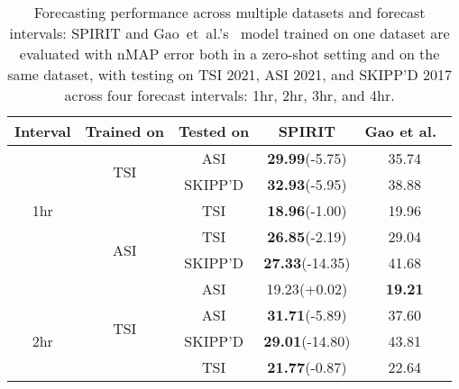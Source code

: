 \begin{table}[h!]
  \caption{
  Forecasting performance across multiple datasets and forecast intervals: SPIRIT and Gao~et~al.'s~\cite{wacv2022} model trained on one dataset are evaluated with nMAP error both in a zero-shot setting and on the same dataset, with testing on TSI 2021, ASI 2021, and SKIPP'D 2017 across four forecast intervals: 1hr, 2hr, 3hr, and 4hr.
  }
  \label{tab:zeroshot_forecast}
  \centering
  \setlength{\tabcolsep}{2pt}
  \renewcommand{\arraystretch}{1.2} 
  \begin{tabular}{c c c c c}
    \hline
    \textbf{Interval} & \textbf{Trained on} & \textbf{Tested on} & \textbf{SPIRIT} & \textbf{Gao et al.~\cite{wacv2022}} \\
    \hline
    \multirow{5}{*}{1hr} & \multirow{2}{*}{TSI} & ASI & \textbf{29.99}\hspace{1mm}\small{\textcolor{mydarkgreen}{(-5.75)}} & 35.74 \\
                          & & SKIPP'D & \textbf{32.93}\hspace{1mm}\small{\textcolor{mydarkgreen}{(-5.95)}} & 38.88 \\
                          & & TSI & \textbf{18.96}\hspace{1mm}\small{\textcolor{mydarkgreen}{(-1.00)}} & 19.96 \\
                          \cline{2-5}
                          & \multirow{2}{*}{ASI} & TSI & \textbf{26.85}\hspace{1mm}\small{\textcolor{mydarkgreen}{(-2.19)}} & 29.04 \\
                          & & SKIPP'D & \textbf{27.33}\hspace{1mm}\small{\textcolor{mydarkgreen}{(-14.35)}} & 41.68 \\
                          & & ASI & 19.23\hspace{1mm}\small{\textcolor{mydarkred}{(+0.02)}} & \textbf{19.21} \\
    \hline
    \multirow{5}{*}{2hr} & \multirow{2}{*}{TSI} & ASI & \textbf{31.71}\hspace{1mm}\small{\textcolor{mydarkgreen}{(-5.89)}} & 37.60 \\
                          & & SKIPP'D & \textbf{29.01}\hspace{1mm}\small{\textcolor{mydarkgreen}{(-14.80)}} & 43.81 \\
                          & & TSI & \textbf{21.77}\hspace{1mm}\small{\textcolor{mydarkgreen}{(-0.87)}} & 22.64 \\

\end{tabular}
\end{table}
